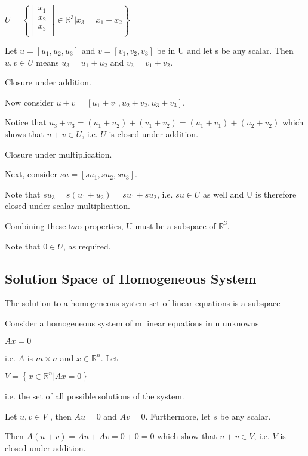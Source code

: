 \documentclass{extarticle}
\begin{document}
\begin{multicols}{4}
$U=\left\{
{\left[\begin{matrix}x_1\\x_2\\x_3\\\end{matrix}\right]}
\in \mathbb{R}^3
\vert
x_3=x_1 + x_2
 \right\}$

Let $u = [u_1, u_2, u_3]$ and $v = [v_1, v_2, v_3]$ be in U and let s be any scalar. Then $u, v \in U$ means $u_3 = u_1 + u_2$ and $v_3 = v_1 + v_2$.

Closure under addition. 

Now consider $u+v = [u_1+v_1, u_2+v_2, u_3+v_3]$.

Notice that $u_3+v_3 = (u_1+u_2)+(v_1+v_2) = (u_1 + v_1) + (u_2 + v_2)$ which shows that $u + v \in U$, i.e. $U$ is closed under addition.

Closure under multiplication.

Next, consider $su = [su_1, su_2, su_3]$.

Note that $su_3 = s(u_1 + u_2) = su_1 + su_2$, i.e. $su \in U$ as well and U is therefore closed under scalar multiplication.

Combining these two properties, U must be a subspace of ${\mathbb{R}}^3$.



Note that $0 \in U$, as required.





\subsection{Solution Space of Homogeneous System}
The solution to a homogeneous system set of linear equations is a subspace
\begin{tcolorbox}[enhanced jigsaw,sharp corners,coltext=black,colback=BurntOrange!25!white,boxrule=0pt,breakable,size=minimal]
Consider a homogeneous system of m linear equations in n unknowns

$Ax=0$

i.e. $A$ is $m \times n$ and $x \in{\mathbb{R}}^n$. Let

$V=\left\{
x
\in \mathbb{R}^n
\vert
Ax=0
 \right\}$


i.e. the set of all possible solutions of the system.

Let $u, v \in V$ , then $Au = 0$ and $Av = 0$. Furthermore, let $s$ be any scalar.

Then $A(u + v) = Au + Av = 0 + 0 = 0$ which show that $u + v \in V$, i.e. $V$ is closed under addition.


\end{tcolorbox}
\end{multicols}
\end{document}
